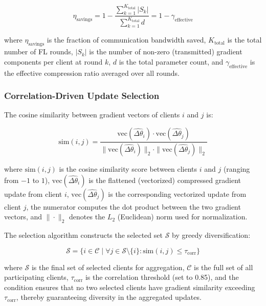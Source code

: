 \documentclass[journal]{IEEEtran}
\begin{document}
\begin{equation}
\eta_{\text{savings}} = 1 - \frac{\sum_{k=1}^{K_{\text{total}}} |S_k|}{\sum_{k=1}^{K_{\text{total}}} d} = 1 - \gamma_{\text{effective}}
\label{eq:savings}
\end{equation}

\noindent where $\eta_{\text{savings}}$ is the fraction of communication bandwidth saved, $K_{\text{total}}$ is the total number of FL rounds, $|S_k|$ is the number of non-zero (transmitted) gradient components per client at round $k$, $d$ is the total parameter count, and $\gamma_{\text{effective}}$ is the effective compression ratio averaged over all rounds.

\subsubsection{Correlation-Driven Update Selection}
The cosine similarity between gradient vectors of clients $i$ and $j$ is:

\begin{equation}
\text{sim}(i, j) = \frac{\text{vec}(\widehat{\Delta\theta}_i) \cdot \text{vec}(\widehat{\Delta\theta}_j)}{\|\text{vec}(\widehat{\Delta\theta}_i)\|_2 \cdot \|\text{vec}(\widehat{\Delta\theta}_j)\|_2}
\label{eq:cosine_sim}
\end{equation}

\noindent where $\text{sim}(i, j)$ is the cosine similarity score between clients $i$ and $j$ (ranging from $-1$ to $1$), $\text{vec}(\widehat{\Delta\theta}_i)$ is the flattened (vectorized) compressed gradient update from client $i$, $\text{vec}(\widehat{\Delta\theta}_j)$ is the corresponding vectorized update from client $j$, the numerator computes the dot product between the two gradient vectors, and $\|\cdot\|_2$ denotes the $L_2$ (Euclidean) norm used for normalization.

The selection algorithm constructs the selected set $\mathcal{S}$ by greedy diversification:

\begin{equation}
\mathcal{S} = \{i \in \mathcal{C} \;|\; \forall j \in \mathcal{S} \setminus \{i\}: \text{sim}(i, j) \leq \tau_{\text{corr}}\}
\label{eq:selection}
\end{equation}

\noindent where $\mathcal{S}$ is the final set of selected clients for aggregation, $\mathcal{C}$ is the full set of all participating clients, $\tau_{\text{corr}}$ is the correlation threshold (set to 0.85), and the condition ensures that no two selected clients have gradient similarity exceeding $\tau_{\text{corr}}$, thereby guaranteeing diversity in the aggregated updates.
\end{document}
